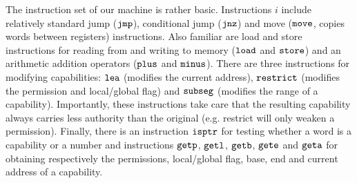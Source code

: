 \documentclass[compsoc,conference,letterpaper,fleqn]{IEEEtran}
\newcommand{\zinstr}[1]{\mathtt{#1}}
\newcommand{\oneinstr}[2]{
  \ifthenelse{\equal{#2}{}}
  {\zinstr{#1}}
  {\zinstr{#1} \; #2}
}
\newcommand{\jmp}[1]{\oneinstr{jmp}{#1}}
\newcommand{\twoinstr}[3]{
  \ifthenelse{\equal{#2#3}{}}
  {\zinstr{#1}}
  {\zinstr{#1} \; #2 \; #3}
}
\newcommand{\restricttwo}[2]{\twoinstr{restrict}{#1}{#2}}
\newcommand{\jnz}[2]{\twoinstr{jnz}{#1}{#2}}
\newcommand{\isptr}[2]{\twoinstr{isptr}{#1}{#2}}
\newcommand{\geta}[2]{\twoinstr{geta}{#1}{#2}}
\newcommand{\getb}[2]{\twoinstr{getb}{#1}{#2}}
\newcommand{\gete}[2]{\twoinstr{gete}{#1}{#2}}
\newcommand{\getp}[2]{\twoinstr{getp}{#1}{#2}}
\newcommand{\getl}[2]{\twoinstr{getl}{#1}{#2}}
\newcommand{\move}[2]{\twoinstr{move}{#1}{#2}}
\newcommand{\store}[2]{\twoinstr{store}{#1}{#2}}
\newcommand{\load}[2]{\twoinstr{load}{#1}{#2}}
\newcommand{\lea}[2]{\twoinstr{lea}{#1}{#2}}
\newcommand{\threeinstr}[4]{
  \ifthenelse{\equal{#2#3#4}{}}
  {\zinstr{#1}}
  {\zinstr{#1} \; #2 \; #3 \; #4}
}
\newcommand{\subseg}[3]{\threeinstr{subseg}{#1}{#2}{#3}}
\newcommand{\plus}[3]{\threeinstr{plus}{#1}{#2}{#3}}
\newcommand{\minus}[3]{\threeinstr{minus}{#1}{#2}{#3}}
\begin{document}
The instruction set of our machine is rather basic. Instructions $i$ include
relatively standard jump ($\jmp{}$), conditional jump ($\jnz{}{}$) and move
($\move{}{}$, copies words between registers) instructions. Also familiar are
load and store instructions for reading from and writing to memory ($\load{}{}$
and $\store{}{}$) and an arithmetic addition operators ($\plus{}{}{}$ and $\minus{}{}{}$). There are
three instructions for modifying capabilities: $\lea{}{}$ (modifies the current
address), $\restricttwo{}{}$ (modifies the permission and local/global flag) and
$\subseg{}{}{}$ (modifies the range of a capability). Importantly, these
instructions take care that the resulting capability always carries less
authority than the original (e.g. restrict will only weaken a permission).
Finally, there is an instruction $\isptr{}{}$ for testing whether a word is a
capability or a number and instructions $\getp{}{}$, $\getl{}{}$, $\getb{}{}$,
$\gete{}{}$ and $\geta{}{}$ for obtaining respectively the permissions,
local/global flag, base, end and current address of a capability.
\end{document}
